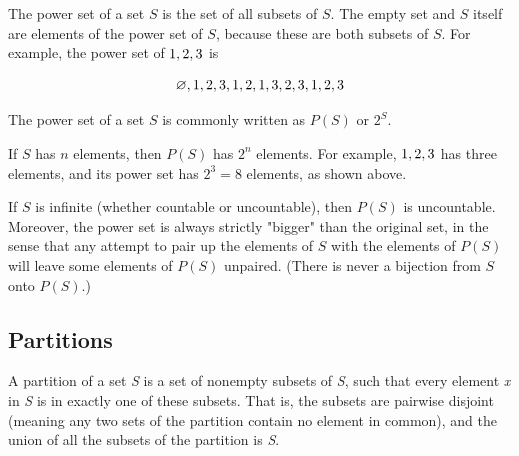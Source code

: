 The power set of a set $S$ is the set of all subsets of $S$. The empty set and $S$ itself
are elements of the power set of $S$, because these are both subsets of $S$. For example,
the power set of $\\{1, 2, 3\\}$ is



$$\\{\varnothing, \\{1\\}, \\{2\\}, \\{3\\}, \\{1, 2\\}, \\{1, 3\\}, \\{2, 3\\}, \\{1, 2, 3\\}\\}$$



The power set of a set $S$ is commonly written as $P(S)$ or $2^S$.



If $S$ has $n$ elements, then $P(S)$ has $2^n$ elements. For example, $\\{1, 2, 3\\}$ has
three elements, and its power set has $2^3 = 8$ elements, as shown above.



If $S$ is infinite (whether countable or uncountable), then $P(S)$ is uncountable.
Moreover, the power set is always strictly "bigger" than the original set, in the sense
that any attempt to pair up the elements of $S$ with the elements of $P(S)$ will leave
some elements of $P(S)$ unpaired. (There is never a bijection from $S$ onto $P(S)$.)




\subsection{Partitions}
\label{sss:part-aea4}




A partition of a set \textit{S} is a set of nonempty subsets of \textit{S}, such that
every element \textit{x} in \textit{S} is in exactly one of these subsets. That is, the
subsets are pairwise disjoint (meaning any two sets of the partition contain no element in
common), and the union of all the subsets of the partition is \textit{S}.




